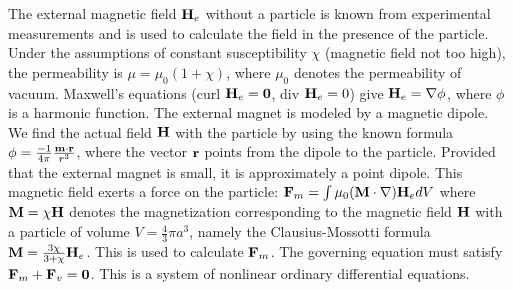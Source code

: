  The external magnetic field ${\bf H}_e$  without a particle is known from experimental measurements and is used to calculate the field in the presence of the particle.  Under the  assumptions of  
   constant susceptibility $\chi$ (magnetic field not too high),  the  permeability is $\mu=\mu_0(1+\chi)$, where $\mu_0$ denotes the permeability of vacuum. Maxwell's 
equations (curl ${\bf H}_e={\bf 0}$, div ${\bf H}_e=0$) give  ${\bf H}_e=\nabla\phi$, where $\phi$ is a harmonic function. 
The external magnet is  modeled by a magnetic dipole. We find the actual field ${\bf H}$ with the particle by using the known formula $\phi=\frac{-1}{4\pi}
\frac{ {\bf m}\cdot  {\bf r}}{r^3}$, where the vector ${\bf r}$ points from the dipole to the 
particle.  Provided that the external magnet is small,  it is approximately a point dipole.
This magnetic field exerts a force on the  particle:  ${\bf F}_m=\int {  \mu_0 ({\bf M}\cdot\nabla){\bf H}_e  dV}$ where ${\bf M}=\chi{\bf H}$ denotes the magnetization corresponding to 
the magnetic field ${\bf H}$ with a particle of volume $V=\frac{4}{3}\pi a^3$, namely the Clausius-Mossotti formula 
\cite{Rosensweig,Cohen2007} \ 
 ${\bf M}=\frac{3\chi}{3+\chi}{\bf H}_e$. This is used to calculate ${\bf F}_m$. The governing equation  must satisfy ${\bf F}_m+{\bf F}_v={\bf 0}$. This is a system of nonlinear ordinary differential equations.


